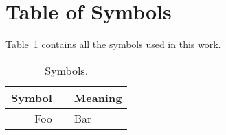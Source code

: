 \section{Table of Symbols}

Table~\ref{tab:symbols} contains all the symbols used in this work.

\begin{table}
\capstart
\centering
\caption{Symbols.}
\label{tab:symbols}
\begin{tabular}{rcl}
\toprule
\hspace*{0.5em}\textbf{Symbol} &\WideNarrow{}{\hspace*{0.5em}}&
\textbf{Meaning}\hspace*{0.5em} \\
\midrule
Foo && Bar \\
\bottomrule
\end{tabular}
\end{table}
